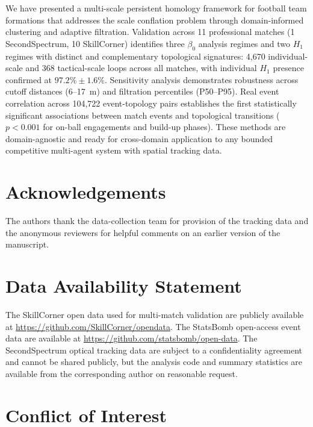\documentclass[11pt,a4paper]{article}
\begin{document}
We have presented a multi-scale persistent homology
framework for football team formations that addresses the
scale conflation problem through domain-informed clustering
and adaptive filtration.  Validation across 11 professional
matches (1 SecondSpectrum, 10 SkillCorner) identifies three
\(\beta_0\) analysis regimes and two \(H_1\) regimes with
distinct and complementary topological signatures: 4,670
individual-scale and 368 tactical-scale loops across all
matches, with individual \(H_1\) presence confirmed at
\(97.2\% \pm 1.6\%\).  Sensitivity analysis demonstrates
robustness across cutoff distances (6--17~m) and filtration
percentiles (P50--P95).  Real event correlation across
104,722 event-topology pairs establishes the first
statistically significant associations between match events
and topological transitions (\(p < 0.001\) for on-ball
engagements and build-up phases).  These methods are
domain-agnostic and ready for cross-domain application to
any bounded competitive multi-agent system with spatial
tracking data.

\section*{Acknowledgements}

The authors thank the data-collection team for provision of
the tracking data and the anonymous reviewers for helpful
comments on an earlier version of the manuscript.

\section*{Data Availability Statement}

The SkillCorner open data used for multi-match validation
are publicly available at
\url{https://github.com/SkillCorner/opendata}.  The
StatsBomb open-access event data are available at
\url{https://github.com/statsbomb/open-data}.  The
SecondSpectrum optical tracking data are subject to a
confidentiality agreement and cannot be shared publicly,
but the analysis code and summary statistics are available
from the corresponding author on reasonable request.

\section*{Conflict of Interest}
\end{document}
